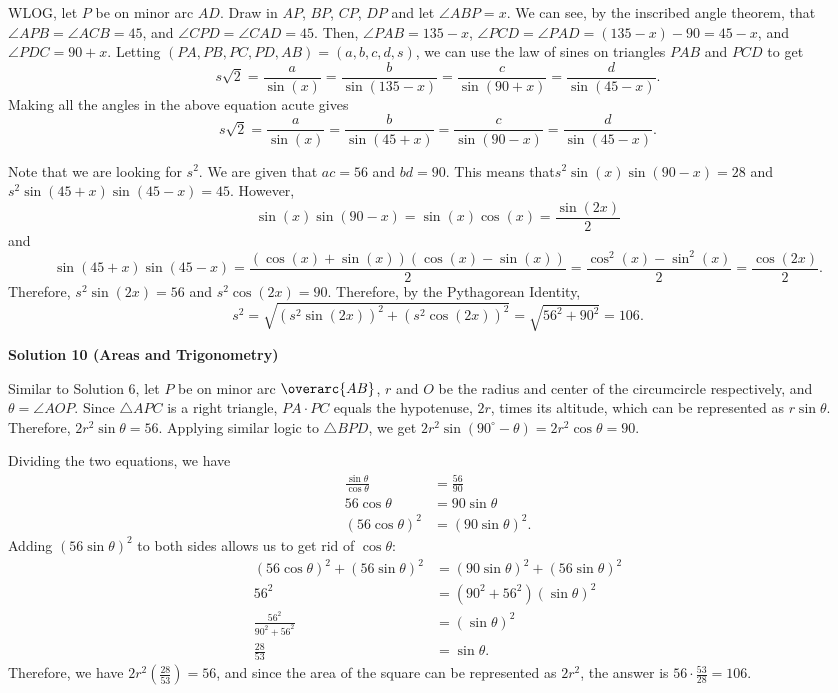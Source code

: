 \begin{enumerate}
WLOG, let $P$ be on minor arc $AD.$ Draw in $AP$, $BP$, $CP$, $DP$ and let $\angle ABP = x.$  We can see, by the inscribed angle theorem, that $\angle APB = \angle ACB = 45$, and $\angle CPD = \angle CAD = 45.$ Then, $\angle PAB = 135-x$, $\angle PCD = \angle PAD = (135-x)-90 = 45-x$, and $\angle PDC = 90+x.$ Letting $(PA, PB, PC, PD, AB) = (a,b,c,d,s)$, we can use the law of sines on triangles $PAB$ and $PCD$ to get 
 \[s\sqrt{2} = \frac{a}{\sin(x)} = \frac{b}{\sin(135-x)} = \frac{c}{\sin(90+x)} = \frac{d}{\sin(45-x)}.\] Making all the angles in the above equation acute gives 
 \[s\sqrt{2} = \frac{a}{\sin(x)} = \frac{b}{\sin(45+x)} = \frac{c}{\sin(90-x)} = \frac{d}{\sin(45-x)}.\] 

 Note that we are looking for $s^{2}.$ We are given that $ac = 56$ and $bd = 90.$ This means that$s^{2}\sin(x)\sin(90-x) = 28$ and $s^{2}\sin(45+x)\sin(45-x) = 45.$ However, 
 \[\sin(x)\sin(90-x) = \sin(x)\cos(x) = \frac{\sin(2x)}{2}\] and 
 \[\sin(45+x)\sin(45-x) = \frac{(\cos(x) + \sin(x))(\cos(x) - \sin(x))}{2} = \frac{\cos^{2}(x) - \sin^{2}(x)}{2} = \frac{\cos(2x)}{2}.\]  Therefore, $s^{2}\sin(2x) = 56$ and $s^{2}\cos(2x) = 90.$ Therefore, by the Pythagorean Identity, 
 \[s^{2} = \sqrt{(s^{2}\sin(2x))^{2} + (s^{2}\cos(2x))^{2}} = \sqrt{56^{2} + 90^{2}} = \boxed{106}.\]




\textbf{Solution 10 (Areas and Trigonometry)}

Similar to Solution 6, let $P$ be on minor arc $\overarc {AB}$, $r$ and $O$ be the radius and center of the circumcircle respectively, and $\theta = \angle AOP$. Since $\triangle APC$ is a right triangle, $PA \cdot PC$ equals the hypotenuse, $2r$, times its altitude, which can be represented as $r \sin \theta$. Therefore, $2r^2 \sin \theta = 56$. Applying similar logic to $\triangle BPD$, we get $2r^2 \sin (90^\circ - \theta) = 2r^2 \cos \theta = 90$.

 Dividing the two equations, we have
 \begin{align*} \frac{\sin \theta}{\cos \theta} &= \frac{56}{90} \\ 56 \cos \theta &= 90 \sin \theta \\ (56 \cos \theta)^2 &= (90 \sin \theta)^2. \end{align*}
Adding $(56 \sin \theta)^2$ to both sides allows us to get rid of $\cos \theta$:
 \begin{align*} (56 \cos \theta)^2 + (56 \sin \theta)^2 &= (90 \sin \theta)^2 + (56 \sin \theta)^2 \\ 56^2 &= (90^2 + 56^2)(\sin \theta)^2 \\ \frac{56^2}{90^2 + 56^2} &= (\sin \theta)^2 \\ \frac{28}{53} &= \sin \theta. \end{align*}
Therefore, we have $2r^2\left(\frac{28}{53}\right) = 56$, and since the area of the square can be represented as $2r^2$, the answer is $56 \cdot \frac{53}{28} = \boxed{106}$.


\end{enumerate}
